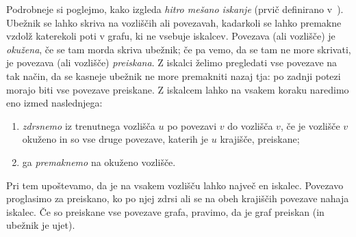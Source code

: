 \documentclass[12pt,a4paper,twoside]{article}
\theoremstyle{definition} %
\theoremstyle{plain} %
\numberwithin{equation}{section}  %
\begin{document}
Podrobneje si poglejmo, kako izgleda \emph{hitro mešano iskanje} (prvič definirano v~\cite{yang2013fast}). Ubežnik se lahko skriva na vozliščih ali povezavah, kadarkoli se lahko premakne vzdolž katerekoli poti v grafu, ki ne vsebuje iskalcev. Povezava (ali vozlišče) je \emph{okužena}, če se tam morda skriva ubežnik; če pa vemo, da se tam ne more skrivati, je povezava (ali vozlišče) \emph{preiskana}. Z iskalci želimo pregledati vse povezave na tak način, da se kasneje ubežnik ne more premakniti nazaj tja: po zadnji potezi morajo biti vse povezave preiskane. Z iskalcem lahko na vsakem koraku naredimo eno izmed naslednjega:
\begin{enumerate}
    \item \emph{zdrsnemo} iz trenutnega vozlišča $u$ po povezavi $v$ do vozlišča $v$, če je vozlišče $v$ okuženo in so vse druge povezave, katerih je $u$ krajišče, preiskane;
    \item ga \emph{premaknemo} na okuženo vozlišče.
\end{enumerate}
Pri tem upoštevamo, da je na vsakem vozlišču lahko največ en iskalec. Povezavo proglasimo za preiskano, ko po njej zdrsi ali se na obeh krajiščih povezave nahaja iskalec. Če so preiskane vse povezave grafa, pravimo, da je graf preiskan (in ubežnik je ujet).
\end{document}
